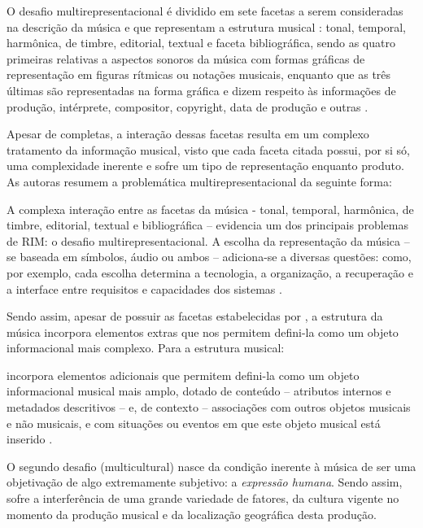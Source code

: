 O desafio multirepresentacional é dividido em sete facetas a serem consideradas na descrição da música e que representam a estrutura musical \cite{downie2003}: tonal, temporal, harmônica, de timbre, editorial, textual e faceta bibliográfica, sendo as quatro primeiras relativas a aspectos sonoros da música com formas gráficas de representação em figuras rítmicas ou notações musicais, enquanto que as três últimas são representadas na forma gráfica e dizem respeito às informações de produção, intérprete, compositor, copyright, data de produção e outras \cite{barros2012}.

Apesar de completas, a interação dessas facetas resulta em um complexo tratamento da informação musical, visto que cada faceta citada possui, por si só, uma complexidade inerente e sofre um tipo de representação enquanto produto. As autoras  resumem a problemática multirepresentacional da seguinte forma:

\begin{citacao}
    A complexa interação entre as facetas da música - tonal, temporal, harmônica, de timbre, editorial, textual e bibliográfica – evidencia um dos principais problemas de RIM: o desafio multirepresentacional. A escolha da representação da música – se baseada em símbolos, áudio ou ambos – adiciona-se a diversas questões: como, por exemplo, cada escolha determina a tecnologia, a organização, a recuperação e a interface entre requisitos e capacidades dos sistemas \cite{santini&souza2007}.
\end{citacao}

Sendo assim, apesar de possuir as facetas estabelecidas por \cite{downie2003}, a estrutura da música incorpora elementos extras que nos permitem defini-la como um objeto informacional mais complexo. Para  a estrutura musical:

\begin{citacao}
    [...] incorpora elementos adicionais que permitem defini-la como um objeto informacional musical mais amplo, dotado de conteúdo – atributos internos e metadados descritivos – e, de contexto – associações com outros objetos musicais e não musicais, e com situações ou eventos em que este objeto musical está inserido \cite{cruz2014}.
\end{citacao}

O segundo desafio (multicultural) nasce da condição inerente à música de ser uma objetivação de algo extremamente subjetivo: a \textit{expressão humana}. Sendo assim, sofre a interferência de uma grande variedade de fatores, da cultura vigente no momento da produção musical e da localização geográfica desta produção.

